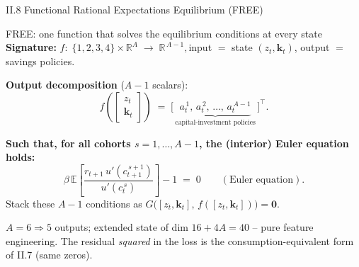 \documentclass[aspectratio=169,11pt]{beamer}
\newcommand{\R}{\mathbb{R}}
\newcommand{\E}[1]{\mathbb{E}\!\left[#1\right]}
\begin{document}
\begin{frame}{II.8 Functional Rational Expectations Equilibrium (FREE)}
\footnotesize
\begin{exampleblock}{FREE: one function that solves the equilibrium conditions at every state}
\vspace{-2pt}
\textbf{Signature:}\;
$
f:\;\{1,2,3,4\}\times \R^{A} \;\longrightarrow\; \R^{\,A-1},
$\quad input $=$ state $(z_t, \bm{k}_t)$, output $=$ savings policies.

\vspace{2pt}
\textbf{Output decomposition} ($A-1$ scalars):
\[
f\!\left(\!\begin{bmatrix} z_t \\ \bm{k}_t \end{bmatrix}\!\right)
\;=\;
\bigl[\,\underbrace{a_t^{\,1},\,a_t^{\,2},\,\ldots,\,a_t^{\,A-1}}_{\text{capital-investment policies}}\,\bigr]^{\!\top}.
\]
\end{exampleblock}

\textbf{Such that, for all cohorts $s = 1, \ldots, A-1$, the (interior) Euler equation holds:}
\[
\beta\,\E{\frac{r_{t+1}\,u'(c_{t+1}^{\,s+1})}{u'(c_t^{\,s})}} - 1 \;=\; 0 \qquad (\text{Euler equation}).
\]
Stack these $A-1$ conditions as $G\bigl([z_t, \bm{k}_t],\, f([z_t, \bm{k}_t])\bigr) = \bm{0}$.

{\scriptsize $A=6 \Rightarrow 5$ outputs; extended state of dim $16+4A=40$ -- pure feature engineering.  The residual \emph{squared} in the loss is the consumption-equivalent form of II.7 (same zeros).}
\end{frame}
\end{document}
